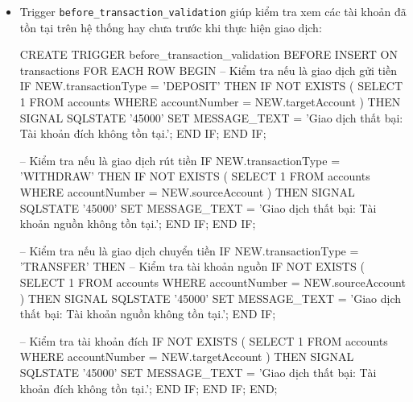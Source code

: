 
\begin{itemize}

    \item Trigger \texttt{before\_transaction\_validation} giúp kiểm tra xem các tài khoản đã tồn tại trên hệ thống hay chưa trước khi thực hiện giao dịch:
    \begin{MySQLCode}
    CREATE TRIGGER before_transaction_validation
    BEFORE INSERT ON transactions
    FOR EACH ROW
    BEGIN
        -- Kiểm tra nếu là giao dịch gửi tiền
        IF NEW.transactionType = 'DEPOSIT' THEN
            IF NOT EXISTS (
                SELECT 1 FROM accounts WHERE accountNumber = NEW.targetAccount
            ) THEN
                SIGNAL SQLSTATE '45000'
                SET MESSAGE_TEXT = 'Giao dịch thất bại: Tài khoản đích không tồn tại.';
            END IF;
        END IF;

        -- Kiểm tra nếu là giao dịch rút tiền
        IF NEW.transactionType = 'WITHDRAW' THEN
            IF NOT EXISTS (
                SELECT 1 FROM accounts WHERE accountNumber = NEW.sourceAccount
            ) THEN
                SIGNAL SQLSTATE '45000'
                SET MESSAGE_TEXT = 'Giao dịch thất bại: Tài khoản nguồn không tồn tại.';
            END IF;
        END IF;

        -- Kiểm tra nếu là giao dịch chuyển tiền
        IF NEW.transactionType = 'TRANSFER' THEN
            -- Kiểm tra tài khoản nguồn
            IF NOT EXISTS (
                SELECT 1 FROM accounts WHERE accountNumber = NEW.sourceAccount
            ) THEN
                SIGNAL SQLSTATE '45000'
                SET MESSAGE_TEXT = 'Giao dịch thất bại: Tài khoản nguồn không tồn tại.';
            END IF;

            -- Kiểm tra tài khoản đích
            IF NOT EXISTS (
                SELECT 1 FROM accounts WHERE accountNumber = NEW.targetAccount
            ) THEN
                SIGNAL SQLSTATE '45000'
                SET MESSAGE_TEXT = 'Giao dịch thất bại: Tài khoản đích không tồn tại.';
            END IF;
        END IF;
    END;
    \end{MySQLCode}

    \newpage


\end{itemize}
